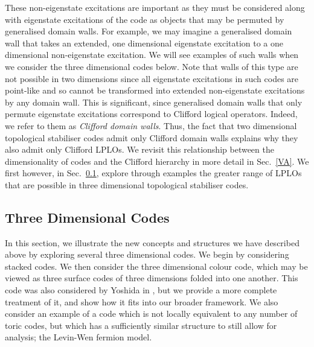 \documentclass[pra,twocolumn,a4paper,nofootinbib]{revtex4-1}
\begin{document}
These non-eigenstate excitations are important as they must be considered along with eigenstate excitations of the code as objects that may be permuted by generalised domain walls. For example, we may imagine a generalised domain wall that takes an extended, one dimensional eigenstate excitation to a one dimensional non-eigenstate excitation. We will see examples of such walls when we consider the three dimensional codes below. Note that walls of this type are not possible in two dimensions since all eigenstate excitations in such codes are point-like and so cannot be transformed into extended non-eigenstate excitations by any domain wall. This is significant, since generalised domain walls that only permute eigenstate excitations correspond to Clifford logical operators. Indeed, we refer to them as \textit{Clifford domain walls}. Thus, the fact that two dimensional topological stabiliser codes admit only Clifford domain walls explains why they also admit only Clifford LPLOs. We revisit this relationship between the dimensionality of codes and the Clifford hierarchy in more detail in Sec.~\ref{VA}. We first however, in Sec.~\ref{IVB}, explore through examples the greater range of LPLOs that are possible in three dimensional topological stabiliser codes.

\subsection{Three Dimensional Codes}
\label{IVB}
In this section, we illustrate the new concepts and structures we have described above by exploring several three dimensional codes. We begin by considering stacked codes. We then consider the three dimensional colour code, which may be viewed as three surface codes of three dimensions folded into one another. This code was also considered by Yoshida in \cite{YoshidaA}, but we provide a more complete treatment of it, and show how it fits into our broader framework. We also consider an example of a code which is not locally equivalent to any number of toric codes, but which has a sufficiently similar structure to still allow for analysis; the Levin-Wen fermion model.
\end{document}
